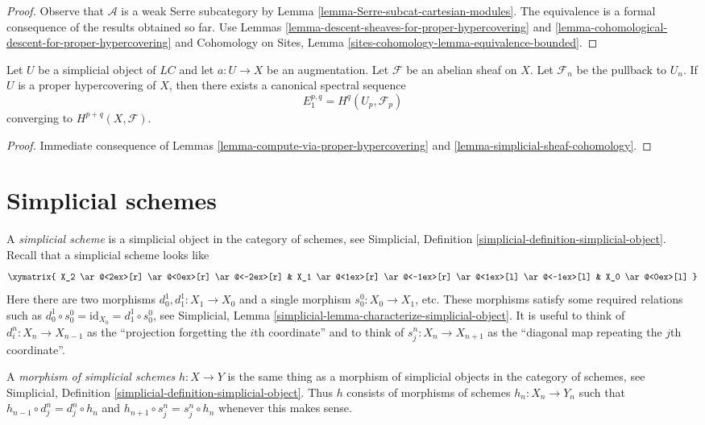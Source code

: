 \begin{proof}
Observe that $\mathcal{A}$ is a weak Serre subcategory by
Lemma \ref{lemma-Serre-subcat-cartesian-modules}.
The equivalence is a
formal consequence of the results obtained so far. Use
Lemmas \ref{lemma-descent-sheaves-for-proper-hypercovering} and
\ref{lemma-cohomological-descent-for-proper-hypercovering} and
Cohomology on Sites, Lemma \ref{sites-cohomology-lemma-equivalence-bounded}.
\end{proof}

\begin{lemma}
\label{lemma-spectral-sequence-proper-hypercovering}
Let $U$ be a simplicial object of $\textit{LC}$ and let
$a : U \to X$ be an augmentation. Let $\mathcal{F}$ be an abelian sheaf
on $X$. Let $\mathcal{F}_n$ be the pullback to $U_n$.
If $U$ is a proper hypercovering of $X$, then
there exists a canonical spectral sequence
$$
E_1^{p, q} = H^q(U_p, \mathcal{F}_p)
$$
converging to $H^{p + q}(X, \mathcal{F})$.
\end{lemma}

\begin{proof}
Immediate consequence of Lemmas \ref{lemma-compute-via-proper-hypercovering}
and \ref{lemma-simplicial-sheaf-cohomology}.
\end{proof}




\section{Simplicial schemes}
\label{section-simplicial}

\noindent
A {\it simplicial scheme} is a simplicial object in the category of schemes,
see Simplicial, Definition \ref{simplicial-definition-simplicial-object}.
Recall that a simplicial scheme looks like
$$
\xymatrix{
X_2
\ar@<2ex>[r]
\ar@<0ex>[r]
\ar@<-2ex>[r]
&
X_1
\ar@<1ex>[r]
\ar@<-1ex>[r]
\ar@<1ex>[l]
\ar@<-1ex>[l]
&
X_0
\ar@<0ex>[l]
}
$$
Here there are two morphisms $d^1_0, d^1_1 : X_1 \to X_0$
and a single morphism $s^0_0 : X_0 \to X_1$, etc.
These morphisms satisfy some required relations such as
$d^1_0 \circ s^0_0 = \text{id}_{X_0} = d^1_1 \circ s^0_0$, see
Simplicial, Lemma \ref{simplicial-lemma-characterize-simplicial-object}.
It is useful to think of $d^n_i : X_n \to X_{n - 1}$
as the ``projection forgetting the $i$th coordinate'' and
to think of $s^n_j : X_n \to X_{n + 1}$ as the ``diagonal map repeating
the $j$th coordinate''.

\medskip\noindent
A {\it morphism of simplicial schemes} $h : X \to Y$ is the same
thing as a morphism of simplicial objects in the category of schemes,
see Simplicial, Definition \ref{simplicial-definition-simplicial-object}.
Thus $h$ consists of morphisms of schemes $h_n : X_n \to Y_n$
such that $h_{n - 1} \circ d^n_j = d^n_j \circ h_n$ and
$h_{n + 1} \circ s^n_j = s^n_j \circ h_n$ whenever this makes sense.

